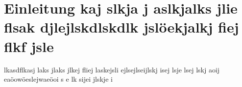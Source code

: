 \section{Einleitung kaj slkja j aslkjalks jlie flsak djlejlskdlskdlk jslöekjalkj fiej flkf jsle}\label{einleitung}
lkasdflkasj laks jlaks jlkej fliej laskejsli ejlsejlseijlskj isej lsje lsej lskj aoij eaöowöeslejwaeöoi s e lk sijei jlskje i